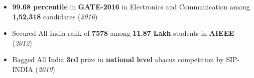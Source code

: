 \documentclass[10pt]{article}
\begin{document}

\vspace*{155pt}    %


\begin{comment}
\colorbox{bl}{\makebox[\textwidth][l]{\bfseries \color{black} ACADEMIC DETAILS}}%
\vspace{0.2cm}
\indent \begin{tabular}
{ l @{\hskip 0.4in} l @{\hskip 0.7in} l @{\hskip 0.4in} l @{\hskip 0.4in} l }
\hline
\vspace{0.1cm}
\textbf{Examination} & \textbf{University/Institute} & \textbf{Year} & \textbf{CPI/\%} \\
\hline
\vspace{0.1cm}
Post Graduation & Indian Institute of Technology Bombay & 2019 & 8.29 \\\vspace{0.1cm}
Graduation & Government College of Engineering, Amravati & 2014 & 8.33\\\vspace{0.1cm}
Intermediate/+2 & Baba Nanak Jr. College, Nagpur & 2010 & 87.67\\\vspace{0.1cm}
Metriculation & Adarsh Vidya Mandir, Nagpur & 2008 & 92.15 \\
\hline
\end{tabular}

\vspace{0.15cm}
\end{comment}


\colorbox{bl}{}
\begin{itemize}[leftmargin=0.4cm]
\vspace{-0.1cm}
	\item \textbf{99.68 percentile} in \textbf{GATE-2016} in Electronics and Communication among \textbf{1,52,318} candidates \hfill{(\textit{2016})}\vspace{-0.2cm}
	\item Secured All India rank of \textbf{7578} among \textbf{11.87 Lakh} students in \textbf{AIEEE} \hfill{(\textit{2012})}\vspace{-0.2cm}
	\item Bagged All India \textbf{3rd} prize in \textbf{national level} abacus competition by SIP-INDIA \hfill{(\textit{2010})}\vspace{-0.2cm}
\end{itemize}
\end{document}
